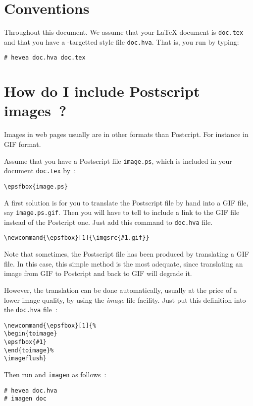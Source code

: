 \usepackage{a4wide}



\section*{Conventions}
Throughout this document. We assume that your \LaTeX{} document is
\texttt{doc.tex} and that you have a \hevea{}-targetted style file
\texttt{doc.hva}. That is, you run \hevea{} by typing:
\begin{verbatim}
# hevea doc.hva doc.tex
\end{verbatim}

\section{How do I include Postscript images~?}\label{image}
Images in web pages usually are in other formats than Postcript.
For instance in GIF format.

Assume that you have a Postscript file \texttt{image.ps},
which is included in your document \texttt{doc.tex} by~:
\begin{verbatim}
\epsfbox{image.ps}
\end{verbatim}

A first solution is for you to translate the Postscript file by hand
into a GIF file, say
\texttt{image.ps.gif}.
Then you will have to tell \hevea{} to include a link to the GIF file
instead of the Postcript one.
Just add this command to \texttt{doc.hva} file.
\begin{verbatim}
\newcommand{\epsfbox}[1]{\imgsrc{#1.gif}}
\end{verbatim}
Note that sometimes, the Postscript file has been produced by
translating a GIF file. In this case, this simple method is the most
adequate, since
translating an image from GIF to Postcript and back to GIF will degrade it.


However, the translation can be done automatically, usually at the
price of a lower image quality, by using the \textit{image} file
facility.
Just put this definition into the \texttt{doc.hva} file~:
\begin{verbatim}
\newcommand{\epsfbox}[1]{%
\begin{toimage}
\epsfbox{#1}
\end{toimage}%
\imageflush}
\end{verbatim}
Then run \hevea{} and \texttt{imagen} as follows~:
\begin{verbatim}
# hevea doc.hva
# imagen doc
\end{verbatim}

